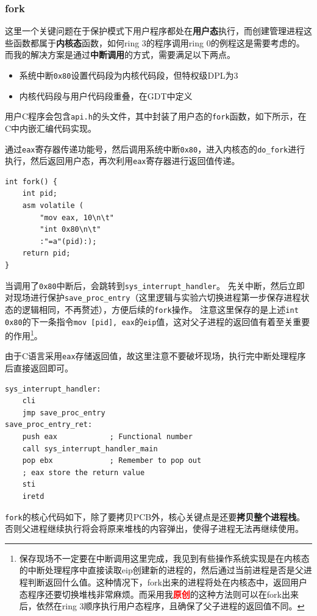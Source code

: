 \documentclass[logo,reportComp]{thesis}
\begin{document}
\subsubsection{fork}
这里一个关键问题在于保护模式下用户程序都处在\textbf{用户态}执行，而创建管理进程这些函数都属于\textbf{内核态}函数，如何ring 3的程序调用ring 0的例程这是需要考虑的。
而我的解决方案是通过\textbf{中断调用}的方式，需要满足以下两点。
\begin{itemize}
	\item 系统中断\verb'0x80'设置代码段为内核代码段，但特权级DPL为3
	\item 内核代码段与用户代码段重叠，在GDT中定义
\end{itemize}

用户C程序会包含\verb'api.h'的头文件，其中封装了用户态的\verb'fork'函数，如下所示，在C中内嵌汇编代码实现。

通过\verb'eax'寄存器传递功能号，然后调用系统中断\verb'0x80'，进入内核态的\verb'do_fork'进行执行，然后返回用户态，再次利用\verb'eax'寄存器进行返回值传递。
\begin{lstlisting}
int fork() {
	int pid;
	asm volatile (
		"mov eax, 10\n\t"
		"int 0x80\n\t"
		:"=a"(pid):);
	return pid;
}
\end{lstlisting}

当调用了\verb'0x80'中断后，会跳转到\verb'sys_interrupt_handler'。
先关中断，然后立即对现场进行保护\verb'save_proc_entry'（这里逻辑与实验六切换进程第一步保存进程状态的逻辑相同，不再赘述），方便后续的\verb'fork'操作。
注意这里保存的是上述\verb'int 0x80'的下一条指令\verb'mov [pid], eax'的\verb'eip'值，这对父子进程的返回值有着至关重要的作用\footnote{保存现场不一定要在中断调用这里完成，我见到有些操作系统实现是在内核态的中断处理程序中直接读取eip创建新的进程的，然后通过当前进程是否是父进程判断返回什么值。这种情况下，fork出来的进程将处在内核态中，返回用户态程序还要切换堆栈非常麻烦。而采用我\textcolor{red}{\textbf{原创}}的这种方法则可以在fork出来后，依然在ring 3顺序执行用户态程序，且确保了父子进程的返回值不同。}。

由于C语言采用\verb'eax'存储返回值，故这里注意不要破坏现场，执行完中断处理程序后直接返回即可。
\begin{lstlisting}[language={[x86masm]Assembler}]
sys_interrupt_handler:
	cli
	jmp save_proc_entry
save_proc_entry_ret:
	push eax            ; Functional number
	call sys_interrupt_handler_main
	pop ebx             ; Remember to pop out
	; eax store the return value
	sti
	iretd
\end{lstlisting}

\verb'fork'的核心代码如下，除了要拷贝PCB外，核心关键点是还要\textbf{拷贝整个进程栈}。
否则父进程继续执行将会将原来堆栈的内容弹出，使得子进程无法再继续使用。
\end{document}
